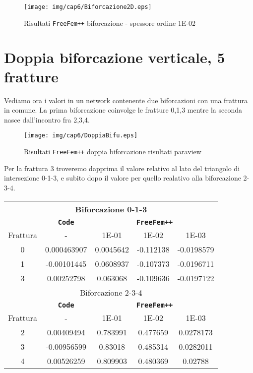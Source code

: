 \begin{figure}[h!]
\centering
\texttt{[image: img/cap6/Biforcazione2D.eps]}
\caption{Risultati \texttt{FreeFem++} biforcazione - spessore ordine 1E-02 }\label{Biforcazione1E-02}
\end{figure}

\section{Doppia biforcazione verticale, 5 fratture}
Vediamo ora i valori in un network contenente due biforcazioni con una frattura in comune.
La prima biforcazione coinvolge le fratture 0,1,3 mentre la seconda nasce dall'incontro fra 2,3,4.\\

\begin{figure}[h!]
\centering
\texttt{[image: img/cap6/DoppiaBifu.eps]}
\caption{Risultati \texttt{FreeFem++} doppia biforcazione risultati paraview }\label{DoppiaBifuVerticalParaview}
\end{figure}

Per la frattura 3 troveremo dapprima il valore relativo al lato del triangolo di intersezione 0-1-3, e subito dopo il valore per quello realativo alla biforcazione 2-3-4.

\begin{center}
\begin{tabular}{|c|c|c|c|c|}
\hline
\multicolumn{5}{|c|}{Biforcazione 0-1-3}\\
\hline
 & \textbf{\texttt{Code}} & \multicolumn{3}{|c|}{\textbf{\texttt{FreeFem++}}} \\
\hline
\multicolumn{1}{|c|}{Frattura} & - &
\multicolumn{1}{|c|}{1E-01} & 1E-02 & 1E-03 \\
\hline
 0 & 0.000463907 & 0.0045642 & -0.112138 & -0.0198579\\
 1 & -0.00101445 & 0.0608937 & -0.107373 & -0.0196711\\  
 3 & 0.00252798 & 0.063068 & -0.109636 & -0.0197122\\
\hline
\multicolumn{5}{|c|}{Biforcazione 2-3-4}\\
\hline
 & \textbf{\texttt{Code}} & \multicolumn{3}{|c|}{\textbf{\texttt{FreeFem++}}} \\
\hline
\multicolumn{1}{|c|}{Frattura} & - &
\multicolumn{1}{|c|}{1E-01} & 1E-02 & 1E-03 \\
\hline
 2 & 0.00409494 & 0.783991 & 0.477659 & 0.0278173\\ 
 3 & -0.00956599 & 0.83018 & 0.485314 & 0.0282011\\
 4 & 0.00526259 & 0.809903 & 0.480369 & 0.02788\\
\hline
\end{tabular}
\end{center}

